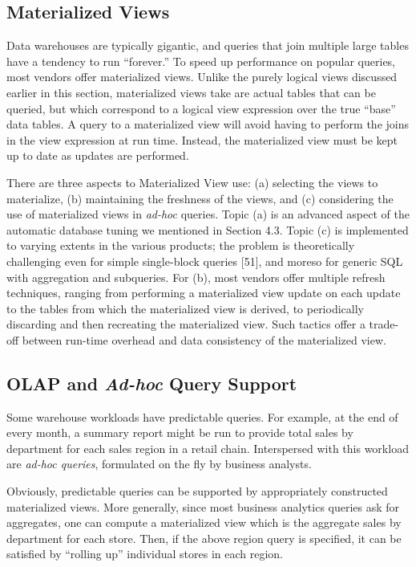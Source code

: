 \documentclass[a4paper,11pt,twoside,openright]{book}
\begin{document}
\hypertarget{materialized-views}{%
\subsection{Materialized Views}\label{materialized-views}}

Data warehouses are typically gigantic, and queries that join multiple
large tables have a tendency to run ``forever.'' To speed up performance
on popular queries, most vendors offer materialized views. Unlike the
purely logical views discussed earlier in this section, materialized
views take are actual tables that can be queried, but which correspond
to a logical view expression over the true ``base'' data tables. A query
to a materialized view will avoid having to perform the joins in the
view expression at run time. Instead, the materialized view must be kept
up to date as updates are performed.

There are three aspects to Materialized View use: (a) selecting the
views to materialize, (b) maintaining the freshness of the views, and
(c) considering the use of materialized views in \emph{ad-hoc} queries.
Topic (a) is an advanced aspect of the automatic database tuning we
mentioned in Section 4.3. Topic (c) is implemented to varying extents in
the various products; the problem is theoretically challenging even for
simple single-block queries {[}51{]}, and moreso for generic SQL with
aggregation and subqueries. For (b), most vendors offer multiple refresh
techniques, ranging from performing a materialized view update on each
update to the tables from which the materialized view is derived, to
periodically discarding and then recreating the materialized view. Such
tactics offer a trade-off between run-time overhead and data consistency
of the materialized view.

\hypertarget{olap-and-ad-hoc-query-support}{%
\subsection{\texorpdfstring{OLAP and \emph{Ad-hoc} Query
Support}{OLAP and Ad-hoc Query Support}}\label{olap-and-ad-hoc-query-support}}

Some warehouse workloads have predictable queries. For example, at the
end of every month, a summary report might be run to provide total sales
by department for each sales region in a retail chain. Interspersed with
this workload are \emph{ad-hoc queries}, formulated on the fly by
business analysts.

Obviously, predictable queries can be supported by appropriately
constructed materialized views. More generally, since most business
analytics queries ask for aggregates, one can compute a materialized
view which is the aggregate sales by department for each store. Then, if
the above region query is specified, it can be satisfied by ``rolling
up'' individual stores in each region.
\end{document}
